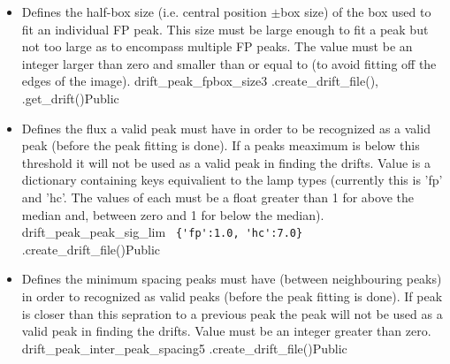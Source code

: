 \begin{itemize}
\item {} 
{Defines the half-box size (i.e. central position $\pm$box size) of the box used to fit an individual FP peak. This size must be large enough to fit a peak but not too large as to encompass multiple FP peaks. The value must be an integer larger than zero and smaller than or equal to  (to avoid fitting off the edges of the image).}
{drift\_peak\_fpbox\_size}{3}
{\calDRIFTPEAK}{\constantsfile}{\spirouRV.create\_drift\_file(), \spirouRV.get\_drift()}{Public}



\item {}
{Defines the flux a valid peak must have in order to be recognized as a valid peak (before the peak fitting is done). If a peaks meaximum is below this threshold it will not be used as a valid peak in finding the drifts. Value is a dictionary containing keys equivalient to the lamp types (currently this is 'fp' and 'hc'. The values of each must be a float greater than 1 for above the median and, between zero and 1 for below the median).}
{drift\_peak\_peak\_sig\_lim}
{\lstinline[style=pythoninline]| {'fp':1.0, 'hc':7.0} |}
{\calDRIFTPEAK}{\constantsfile}{\spirouRV.create\_drift\_file()}{Public}


\item {}
{Defines the minimum spacing peaks must have (between neighbouring peaks) in order to recognized as valid peaks (before the peak fitting is done). If peak is closer than this sepration to a previous peak the peak will not be used as a valid peak in finding the drifts. Value must be an integer greater than zero.}
{drift\_peak\_inter\_peak\_spacing}{5}
{\calDRIFTPEAK}{\constantsfile}{\spirouRV.create\_drift\_file()}{Public}



\end{itemize}
